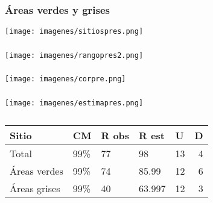 \documentclass[compress]{beamer}
\begin{document}
{
\begin{frame}
\frametitle{Áreas verdes y grises}
\vspace{-1cm}
\begin{center}
\hspace*{-0.9cm}\texttt{[image: imagenes/sitiospres.png]}\\
\end{center}
\end{frame}
}


{
\begin{frame}
\frametitle{}
\vspace{-1.8cm}
\begin{center}
\hspace*{-1.2cm}\texttt{[image: imagenes/rangopres2.png]}\\
\end{center}
\end{frame}
}

{
\begin{frame}
\frametitle{}
\vspace{-1cm}
\begin{center}
\texttt{[image: imagenes/corpre.png]}\\
\end{center}
\end{frame}
}

{
\begin{frame}
\frametitle{}
\begin{center}
\texttt{[image: imagenes/estimapres.png]}\\
\end{center}
\vspace{-0.5cm}
{\tiny
\begin{longtable}[c] {lllllr} 
\caption{} \\
Sitio &CM & R obs  & R est & U & D   \\ \midrule
Total  & 99\% & 77 & 98 & 13 & 4 \\
Áreas verdes  & 99\% & 74 & 85.99 & 12 & 6 \\
Áreas grises  & 99\% & 40 & 63.997 & 12 & 3 \\ \bottomrule
\end{longtable}
}\\[5cm]

\end{frame}
}
\end{document}
